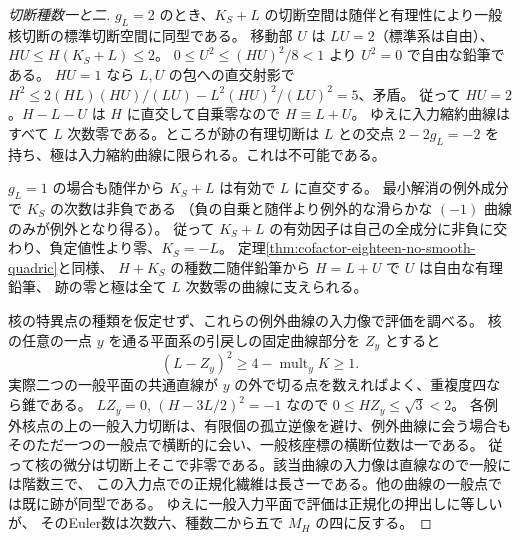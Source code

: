 \begin{proof}[切断種数一と二]
$g_L=2$ のとき、$K_S+L$ の切断空間は随伴と有理性により一般核切断の標準切断空間に同型である。
移動部 $U$ は $LU=2$（標準系は自由）、$HU\le H(K_S+L)\le2$。
$0\le U^2\le (HU)^2/8<1$ より $U^2=0$ で自由な鉛筆である。
$HU=1$ なら $L,U$ の包への直交射影で $H^2\le 2(HL)(HU)/(LU)-L^2(HU)^2/(LU)^2=5$、矛盾。
従って $HU=2$。$H-L-U$ は $H$ に直交して自乗零なので $H\equiv L+U$。
ゆえに入力縮約曲線はすべて $L$ 次数零である。ところが跡の有理切断は
$L$ との交点 $2-2g_L=-2$ を持ち、極は入力縮約曲線に限られる。これは不可能である。

$g_L=1$ の場合も随伴から $K_S+L$ は有効で $L$ に直交する。
最小解消の例外成分で $K_S$ の次数は非負である
（負の自乗と随伴より例外的な滑らかな $(-1)$ 曲線のみが例外となり得る）。
従って $K_S+L$ の有効因子は自己の全成分に非負に交わり、負定値性より零、$K_S=-L$。
定理\ref{thm:cofactor-eighteen-no-smooth-quadric}と同様、
$H+K_S$ の種数二随伴鉛筆から $H=L+U$ で $U$ は自由な有理鉛筆、
跡の零と極は全て $L$ 次数零の曲線に支えられる。

核の特異点の種類を仮定せず、これらの例外曲線の入力像で評価を調べる。
核の任意の一点 $y$ を通る平面系の引戻しの固定曲線部分を $Z_y$ とすると
\[
        (L-Z_y)^2\ge4-\operatorname{mult}_yK\ge1 .
\]
実際二つの一般平面の共通直線が $y$ の外で切る点を数えればよく、重複度四なら錐である。
$LZ_y=0$, $(H-3L/2)^2=-1$ なので $0\le HZ_y\le\sqrt3<2$。
各例外核点の上の一般入力切断は、有限個の孤立逆像を避け、例外曲線に会う場合も
そのただ一つの一般点で横断的に会い、一般核座標の横断位数は一である。
従って核の微分は切断上そこで非零である。該当曲線の入力像は直線なので一般には階数三で、
この入力点での正規化繊維は長さ一である。他の曲線の一般点では既に跡が同型である。
ゆえに一般入力平面で評価は正規化の押出しに等しいが、
そのEuler数は次数六、種数二から五で $M_H$ の四に反する。
\end{proof}

